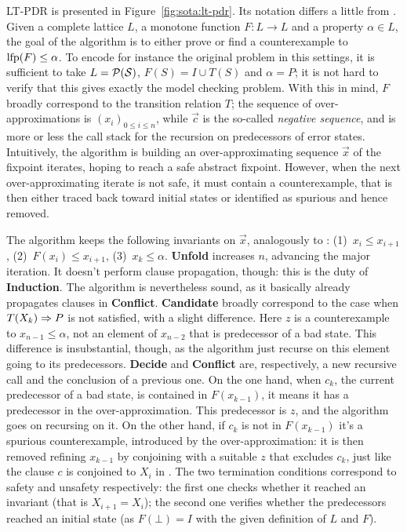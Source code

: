 LT-PDR is presented in Figure~\ref{fig:sota:lt-pdr}. Its notation differs a little from . Given a complete lattice $L$, a monotone function $F: L \rightarrow L$ and a property $\alpha \in L$, the goal of the algorithm is to either prove or find a counterexample to $\text{lfp}(F) \le \alpha$. To encode for instance the original  problem in this settings, it is sufficient to take $L = \mathcal{P}(\mathcal{S})$, $F(S) = I \cup T(S)$ and $\alpha = P$; it is not hard to verify that this gives exactly the model checking problem.
With this in mind, $F$ broadly correspond to the transition relation $T$; the sequence of over-approximations is $( x_i )_{0 \le i \le n}$, while $\vec{c}$ is the so-called \emph{negative sequence}, and is more or less the call stack for the recursion on predecessors of error states.
Intuitively, the algorithm is building an over-approximating sequence $\vec{x}$ of the fixpoint iterates, hoping to reach a safe abstract fixpoint. However, when the next over-approximating iterate is not safe, it must contain a counterexample, that is then either traced back toward initial states or identified as spurious and hence removed.

The algorithm keeps the following invariants on $\vec{x}$, analogously to : (1)~$x_i \le x_{i+1}$, (2)~$F(x_i) \le x_{i+1}$, (3)~$x_k \le \alpha$.
\textbf{Unfold} increases $n$, advancing the major iteration. It doesn't perform clause propagation, though: this is the duty of \textbf{Induction}. The algorithm is nevertheless sound, as it basically already propagates clauses in \textbf{Conflict}.
\textbf{Candidate} broadly correspond to the case when $T(X_k) \Rightarrow P$ is not satisfied, with a slight difference. Here $z$ is a counterexample to $x_{n-1} \le \alpha$, not an element of $x_{n-2}$ that is predecessor of a bad state. This difference is insubstantial, though, as the algorithm just recurse on this element going to its predecessors.
\textbf{Decide} and \textbf{Conflict} are, respectively, a new recursive call and the conclusion of a previous one. On the one hand, when $c_k$, the current predecessor of a bad state, is contained in $F (x_{k-1})$, it means it has a predecessor in the over-approximation. This predecessor is $z$, and the algorithm goes on recursing on it. On the other hand, if $c_k$ is not in $F (x_{k-1})$ it's a spurious counterexample, introduced by the over-approximation: it is then removed refining $x_{k-1}$ by conjoining with a suitable $z$ that excludes $c_k$, just like the clause $c$ is conjoined to $X_i$ in .
The two termination conditions correspond to safety and unsafety respectively: the first one checks whether it reached an invariant (that is $X_{i+1} = X_i$); the second one verifies whether the predecessors reached an initial state (as $F(\bot) = I$ with the given definition of $L$ and $F$).


